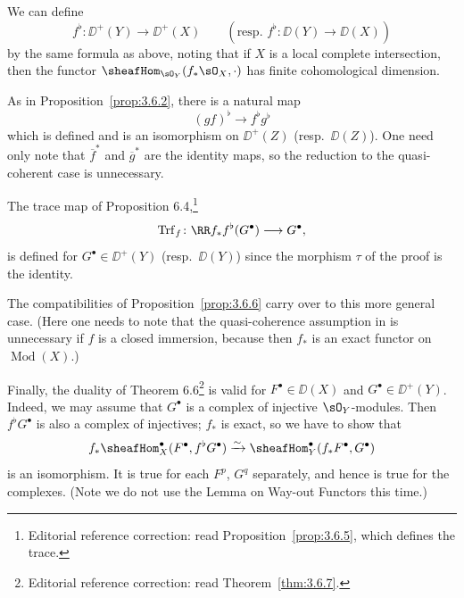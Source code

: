 We can define
\[
f^{\flat}\colon \DD^+(Y)\longrightarrow \DD^+(X) \qquad (\text{resp.\ } f^{\flat}\colon \DD(Y)\longrightarrow \DD(X))
\]
by the same formula as above, noting that if $X$ is a local complete intersection, then the functor $\sheafHom_{\sO_Y}(f_*\sO_X,\cdot)$ has finite cohomological dimension.

As in Proposition~\ref{prop:3.6.2}, there is a natural map
\[
(gf)^{\flat} \longrightarrow f^{\flat}g^{\flat}
\]
which is defined and is an isomorphism on $\DD^+(Z)$ (resp.\ $\DD(Z)$). One need only note that $\overline{f}^*$ and $\overline{g}^*$ are the identity maps, so the reduction to the quasi-coherent case is unnecessary.

The trace map of Proposition 6.4,\footnote{Editorial reference correction: read Proposition~\ref{prop:3.6.5}, which defines the trace.}
\[
\operatorname{Trf}_f \colon \RR f_* f^{\flat}(G^\bullet) \longrightarrow G^\bullet,
\]
is defined for $G^\bullet\in\DD^+(Y)$ (resp.\ $\DD(Y)$) since the morphism $\tau$ of the proof is the identity.

The compatibilities of Proposition~\ref{prop:3.6.6} carry over to this more general case. (Here one needs to note that the quasi-coherence assumption in  is unnecessary if $f$ is a closed immersion, because then $f_*$ is an exact functor on $\operatorname{Mod}(X)$.)

Finally, the duality of Theorem 6.6\footnote{Editorial reference correction: read Theorem~\ref{thm:3.6.7}.} is valid for $F^\bullet\in\DD(X)$ and $G^\bullet\in\DD^+(Y)$. Indeed, we may assume that $G^\bullet$ is a complex of injective $\sO_Y$-modules. Then $f^{\flat}G^\bullet$ is also a complex of injectives; $f_*$ is exact, so we have to show that
\[
f_*\sheafHom_X^\bullet(F^\bullet, f^{\flat}G^\bullet) \xrightarrow{\sim} \sheafHom_Y^\bullet(f_*F^\bullet, G^\bullet)
\]
is an isomorphism. It is true for each $F^p$, $G^q$ separately, and hence is true for the complexes. (Note we do not use the Lemma on Way-out Functors this time.)

